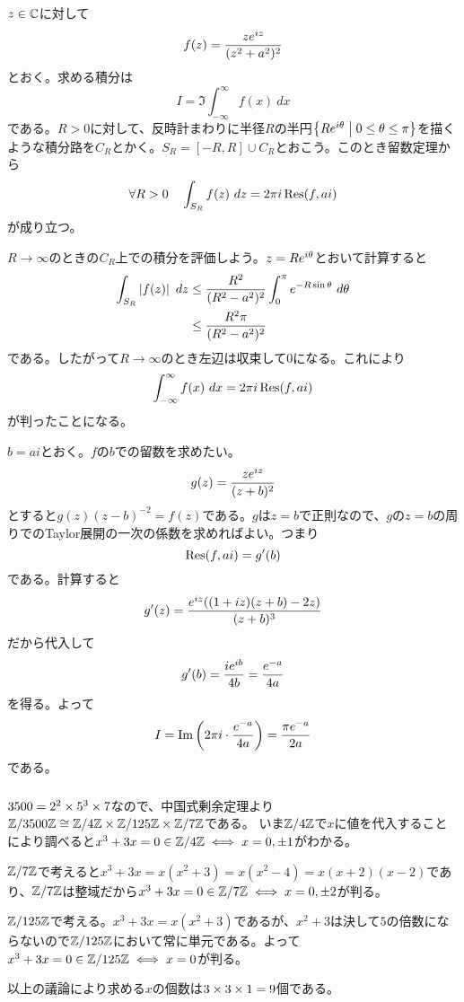 \newpage

\subsubsection{}%
\begin{sol}
$z \in {\mathbb C}$に対して
\[
f(z) = \frac{z e^{iz} }{ (z^2 + a^2 )^2 }
\]
とおく。求める積分は
\[
I = \Im \int_{-\infty}^{\infty} f(x) \ dx
\]
である。$R > 0$に対して、反時計まわりに半径$R$の半円$\left\{ Re^{i{\theta}}  \mathrel{} \middle| \mathrel{} 0 \leq {\theta} \leq \pi \right\}$を描くような積分路を$C_R$とかく。$S_R = [-R,R] \cup C_R$とおこう。このとき留数定理から
\[
\forall R > 0 \quad \int_{S_R} f(z) \ dz = 2 \pi i \operatorname{Res}(f, ai)
\]
が成り立つ。

$R \to \infty $のときの$C_R$上での積分を評価しよう。$z = R e^{i{\theta}}$とおいて計算すると
\begin{align*}
  \int_{S_R} \left \lvert  f(z) \right \rvert \ dz &\leq \frac{ R^2 }{ (R^2 - a^2)^2 } \int_0^{\pi} e^{-R \sin {\theta}} \ d{\theta} \\
  &\leq \frac{ R^2 \pi }{ (R^2 - a^2)^2 }
\end{align*}
である。したがって$R \to \infty$のとき左辺は収束して$0$になる。これにより
\[
\int_{-\infty}^{\infty} f(x) \ dx = 2 \pi i \operatorname{Res}(f, ai)
\]
が判ったことになる。

$b=ai$とおく。$f$の$b$での留数を求めたい。
\[
g(z) = \frac{z e^{iz} }{ (z+b)^2 }
\]
とすると$g(z)(z-b)^{-2} = f(z)$である。$g$は$z = b$で正則なので、$g$の$z=b$の周りでのTaylor展開の一次の係数を求めればよい。つまり
\[
\operatorname{Res}(f, ai) = g'(b)
\]
である。計算すると
\[
g'(z) = \frac{ e^{iz} ( (1+iz)(z+b) - 2z ) }{ (z+b)^3 }
\]
だから代入して
\[
g'(b) = \frac{i e^{ib} }{4b} = \frac{ e^{-a} }{ 4a }
\]
を得る。よって
\[
I = \operatorname{Im} \left( 2\pi i \cdot \frac{ e^{-a} }{ 4a } \right) = \frac{\pi e^{-a} }{2a }
\]
である。
\end{sol}

\newpage


\subsubsection{}%
\begin{sol}
$3500 = 2^2 \times 5^3 \times 7$なので、中国式剰余定理より${\mathbb Z} / 3500 {\mathbb Z} \cong {\mathbb Z} / 4{\mathbb Z} \times {\mathbb Z} / 125 {\mathbb Z} \times {\mathbb Z} / 7{\mathbb Z}$である。
いま${\mathbb Z} / 4{\mathbb Z}$で$x$に値を代入することにより調べると$x^3 + 3x = 0 \in {\mathbb Z} / 4 {\mathbb Z} \iff x = 0, \pm 1$がわかる。

${\mathbb Z} / 7 {\mathbb Z}$で考えると$x^3 + 3x = x(x^2 + 3) = x(x^2 - 4)= x(x+2)(x-2)$であり、${\mathbb Z} / 7 {\mathbb Z}$は整域だから$x^3 + 3x = 0 \in {\mathbb Z} / 7 {\mathbb Z} \iff x = 0, \pm 2$が判る。

${\mathbb Z} / 125 {\mathbb Z}$で考える。$x^3 + 3x = x(x^2 + 3)$であるが、$x^2 + 3$は決して$5$の倍数にならないので${\mathbb Z} / 125 {\mathbb Z}$において常に単元である。よって$x^3 + 3x = 0 \in {\mathbb Z} / 125 {\mathbb Z} \iff x = 0$が判る。

以上の議論により求める$x$の個数は$3 \times 3 \times 1 = 9$個である。
\end{sol}

